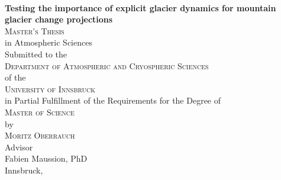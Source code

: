 \begin{titlepage}
\begin{center}

~\\[15mm]
{\Huge  {\bf Testing the importance of explicit glacier dynamics for mountain glacier change projections}}\\[5mm]




{\Large \textsc{Master's Thesis}} \\[15mm]


{\large in Atmospheric Sciences} \\[15mm]


{\large Submitted to the} \\[2mm]
{\Large \textsc{Department of Atmospheric and Cryospheric Sciences}} \\[2mm]
{\large of the} \\[2mm]
{\Large \textsc{University of Innsbruck}} \\[15mm]


{\large in Partial Fulfillment of the Requirements for the Degree of} \\[2mm]
{\Large \textsc{Master of Science}} \\[15mm]


{\large by} \\[2mm]
{\Large \textsc{Moritz Oberrauch}} \\[15mm]


{\large Advisor} \\[2mm]
{\large Fabien Maussion, PhD} \\[15mm]


{\large Innsbruck, \monthyeardate{\today}}


\end{center}
\end{titlepage}
